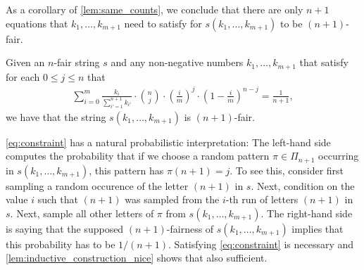 \documentclass{article}
\begin{document}
As a corollary of \cref{lem:same_counts}, we conclude that there are only $n+1$ equations that $k_1, \dots, k_{m+1}$ need to satisfy for $s(k_1, \dots, k_{m+1})$ to be $(n+1)$-fair. 
\begin{lemma}
    \label{lem:inductive_construction_nice}
    Given an $n$-fair string $s$ and any non-negative numbers $k_1, \dots, k_{m+1}$ that satisfy for each $0 \le j \le n$ that
    \begin{align}
    \label{eq:constraint}
    \sum_{i = 0}^m  \frac{k_i}{\sum_{i' = 1}^{n+1} k_{i'}} \cdot \binom{n}{j} \cdot \left( \frac{i}{m} \right)^j \cdot\left( 1 - \frac{i}{m}\right)^{n-j}
    = \frac{1}{n+1},
\end{align}
    we have that the string $s(k_1, \dots, k_{m+1})$ is $(n+1)$-fair. 
\end{lemma}
\cref{eq:constraint} has a natural probabilistic interpretation: The left-hand side computes the probability that if we choose a random pattern $\pi \in \Pi_{n+1}$ occurring in $s(k_1, \dots, k_{m+1})$, this pattern has $\pi(n+1) = j$. To see this, consider first sampling a random occurence of the letter $(n+1)$ in $s$. Next, condition on the value $i$ such that $(n+1)$ was sampled from the $i$-th run of letters $(n+1)$ in $s$. Next, sample all other letters of $\pi$ from $s(k_1, \dots, k_{m+1})$. The right-hand side is saying that the supposed $(n+1)$-fairness of $s(k_1, \dots, k_{m+1})$ implies that this probability has to be $1/(n+1)$. Satisfying \cref{eq:constraint} is necessary and \cref{lem:inductive_construction_nice} shows that also sufficient. 
\end{document}

